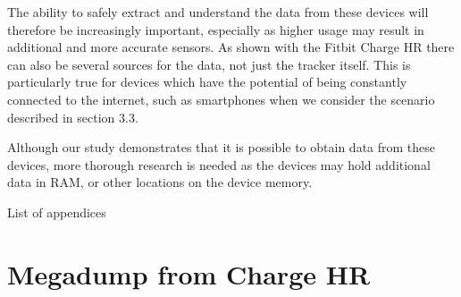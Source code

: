 \documentclass[a4paper,11pt,dvips]{article}
\begin{document}
The ability to safely extract and understand the data from these devices will therefore be increasingly important, especially as higher usage may result in additional and more accurate sensors. As shown with the Fitbit Charge HR there can also be several sources for the data, not just the tracker itself. This is particularly true for devices which have the potential of being constantly connected to the internet, such as smartphones when we consider the scenario described in section 3.3.  

Although our study demonstrates that it is possible to obtain data from these devices, more thorough research is needed as the devices may hold additional data in RAM, or other locations on the device memory. 




\newpage
\appendix
\Huge{List of appendices}
\normalsize
\section{Megadump from Charge HR}\label{app:megadump}
\end{document}
